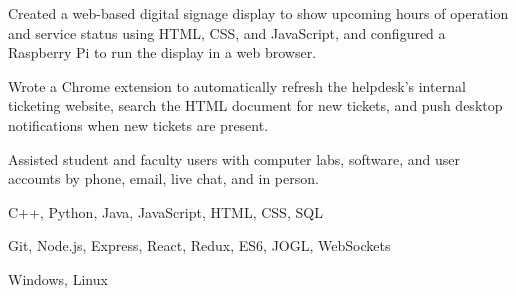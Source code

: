 \documentclass[10pt]{article}
\begin{document}
\begin{bullets}
  \item Created a web-based digital signage display to show upcoming hours of operation and service status using
        HTML, CSS, and JavaScript, and configured a Raspberry Pi to run the display in a web browser.
  \item Wrote a Chrome extension to automatically refresh the helpdesk's internal ticketing website, search the
        HTML document for new tickets, and push desktop notifications when new tickets are present.
  \item Assisted student and faculty users with computer labs, software, and user accounts by phone, email, live
        chat, and in person.
\end{bullets}

\begin{bullets}
  \item {} C++, Python, Java, JavaScript, HTML, CSS, SQL
  \item {} Git, Node.js, Express, React, Redux, ES6, JOGL, WebSockets
  \item {} Windows, Linux
\end{bullets}
\end{document}
